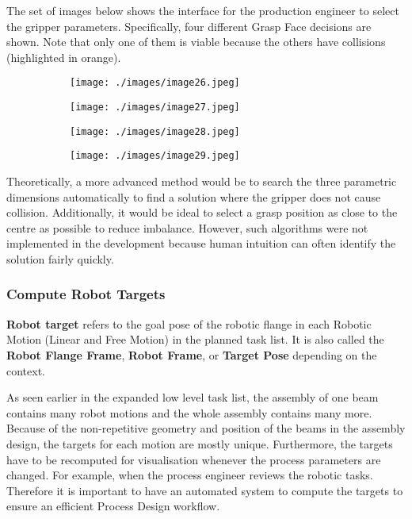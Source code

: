 The set of images below shows the interface for the production engineer to select the gripper parameters. Specifically, four different Grasp Face decisions are shown. Note that only one of them is viable because the others have collisions (highlighted in orange). 

\begin{figure}[H]
\centering
\begin{subfigure}[b]{0.23\textwidth}
\centering
\texttt{[image: ./images/image26.jpeg]}
\end{subfigure}
\hfill
\begin{subfigure}[b]{0.23\textwidth}
\centering
\texttt{[image: ./images/image27.jpeg]}
\end{subfigure}
\hfill
\begin{subfigure}[b]{0.23\textwidth}
\centering
\texttt{[image: ./images/image28.jpeg]}
\end{subfigure}
\hfill
\begin{subfigure}[b]{0.23\textwidth}
\centering
\texttt{[image: ./images/image29.jpeg]}
\end{subfigure}
\end{figure}


Theoretically, a more advanced method would be to search the three parametric dimensions automatically to find a solution where the gripper does not cause collision. Additionally, it would be ideal to select a grasp position as close to the centre as possible to reduce imbalance. However, such algorithms were not implemented in the development because human intuition can often identify the solution fairly quickly. 

\subsubsection{Compute Robot Targets}

\textbf{Robot target }refers to the goal pose of the robotic flange in each Robotic Motion (Linear and Free Motion) in the planned task list. It is also called the \textbf{Robot Flange Frame}, \textbf{Robot Frame}, or \textbf{Target Pose} depending on the context. 

As seen earlier in the expanded low level task list, the assembly of one beam contains many robot motions and the whole assembly contains many more. Because of the non-repetitive geometry and position of the beams in the assembly design, the targets for each motion are mostly unique. Furthermore, the targets have to be recomputed for visualisation whenever the process parameters are changed. For example, when the process engineer reviews the robotic tasks. Therefore it is important to have an automated system to compute the targets to ensure an efficient Process Design workflow.

